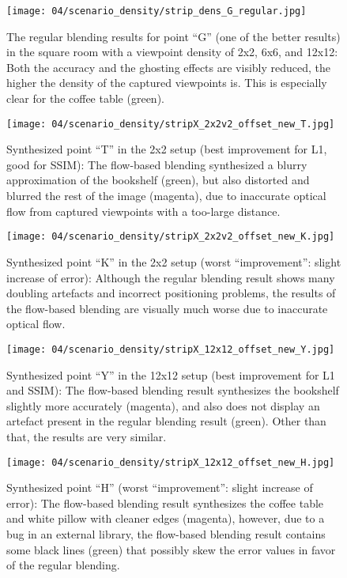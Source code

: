 \begin{figure}
		\centering
    \texttt{[image: 04/scenario\_density/strip\_dens\_G\_regular.jpg]}
		\caption[Regular blending results for viewpoint ``G'' with different densities] {The regular blending results for point ``G'' (one of the better results) in the square room with a viewpoint density of 2x2, 6x6, and 12x12: Both the accuracy and the ghosting effects are visibly reduced, the higher the density of the captured viewpoints is. This is especially clear for the coffee table (green).}
		\label{fig:density_regular_G}
\end{figure}

\begin{figure}
  \centering
  \texttt{[image: 04/scenario\_density/stripX\_2x2v2\_offset\_new\_T.jpg]}
  \caption[Viewpoint ``T'' in the 2x2 setup]{Synthesized point ``T'' in the 2x2 setup (best improvement for L1, good for SSIM): The flow-based blending synthesized a blurry approximation of the bookshelf (green), but also distorted and blurred the rest of the image (magenta), due to inaccurate optical flow from captured viewpoints with a too-large distance.}
  \label{fig:dens_2x2_T}
\end{figure}

\begin{figure}
  \centering
  \texttt{[image: 04/scenario\_density/stripX\_2x2v2\_offset\_new\_K.jpg]}
  \caption[Viewpoint ``K'' in the 2x2 setup]{Synthesized point ``K'' in the 2x2 setup (worst ``improvement'': slight increase of error): Although the regular blending result shows many doubling artefacts and incorrect positioning problems, the results of the flow-based blending are visually much worse due to inaccurate optical flow.}
  \label{fig:dens_2x2_K}
\end{figure}

\begin{figure}
  \centering
  \texttt{[image: 04/scenario\_density/stripX\_12x12\_offset\_new\_Y.jpg]}
  \caption[Viewpoint ``Y'' in the 12x12 setup]{Synthesized point ``Y'' in the 12x12 setup (best improvement for L1 and SSIM): The flow-based blending result synthesizes the bookshelf slightly more accurately (magenta), and also does not display an artefact present in the regular blending result (green). Other than that, the results are very similar.}
  \label{fig:dens_12x12_Y}
\end{figure}

\begin{figure}
  \centering
  \texttt{[image: 04/scenario\_density/stripX\_12x12\_offset\_new\_H.jpg]}
  \caption[Viewpoint ``H'' in the 12x12 setup]{Synthesized point ``H'' (worst ``improvement'': slight increase of error): The flow-based blending result synthesizes the coffee table and white pillow with cleaner edges (magenta), however, due to a bug in an external library, the flow-based blending result contains some black lines (green) that possibly skew the error values in favor of the regular blending.}
  \label{fig:dens_12x12_H}
\end{figure}

